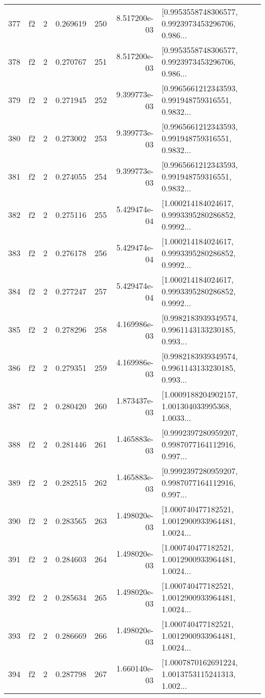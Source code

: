 \begin{tabular}{lllrlrl}
377 &  f2 &   2 &  0.269619 &  250 &  8.517200e-03 &  [0.9953558748306577, 0.9923973453296706, 0.986... \\
378 &  f2 &   2 &  0.270767 &  251 &  8.517200e-03 &  [0.9953558748306577, 0.9923973453296706, 0.986... \\
379 &  f2 &   2 &  0.271945 &  252 &  9.399773e-03 &  [0.9965661212343593, 0.991948759316551, 0.9832... \\
380 &  f2 &   2 &  0.273002 &  253 &  9.399773e-03 &  [0.9965661212343593, 0.991948759316551, 0.9832... \\
381 &  f2 &   2 &  0.274055 &  254 &  9.399773e-03 &  [0.9965661212343593, 0.991948759316551, 0.9832... \\
382 &  f2 &   2 &  0.275116 &  255 &  5.429474e-04 &  [1.000214184024617, 0.9993395280286852, 0.9992... \\
383 &  f2 &   2 &  0.276178 &  256 &  5.429474e-04 &  [1.000214184024617, 0.9993395280286852, 0.9992... \\
384 &  f2 &   2 &  0.277247 &  257 &  5.429474e-04 &  [1.000214184024617, 0.9993395280286852, 0.9992... \\
385 &  f2 &   2 &  0.278296 &  258 &  4.169986e-03 &  [0.9982183939349574, 0.9961143133230185, 0.993... \\
386 &  f2 &   2 &  0.279351 &  259 &  4.169986e-03 &  [0.9982183939349574, 0.9961143133230185, 0.993... \\
387 &  f2 &   2 &  0.280420 &  260 &  1.873437e-03 &  [1.0009188204902157, 1.001304033995368, 1.0033... \\
388 &  f2 &   2 &  0.281446 &  261 &  1.465883e-03 &  [0.9992397280959207, 0.9987077164112916, 0.997... \\
389 &  f2 &   2 &  0.282515 &  262 &  1.465883e-03 &  [0.9992397280959207, 0.9987077164112916, 0.997... \\
390 &  f2 &   2 &  0.283565 &  263 &  1.498020e-03 &  [1.000740477182521, 1.0012900933964481, 1.0024... \\
391 &  f2 &   2 &  0.284603 &  264 &  1.498020e-03 &  [1.000740477182521, 1.0012900933964481, 1.0024... \\
392 &  f2 &   2 &  0.285634 &  265 &  1.498020e-03 &  [1.000740477182521, 1.0012900933964481, 1.0024... \\
393 &  f2 &   2 &  0.286669 &  266 &  1.498020e-03 &  [1.000740477182521, 1.0012900933964481, 1.0024... \\
394 &  f2 &   2 &  0.287798 &  267 &  1.660140e-03 &  [1.0007870162691224, 1.0013753115241313, 1.002... \\

\end{tabular}
